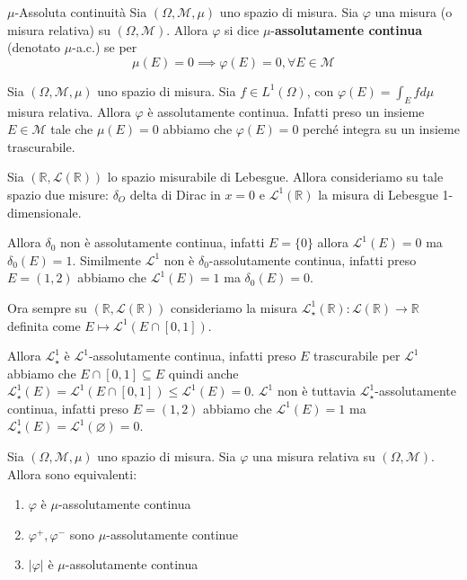 \begin{definition}{\(\mu\)-Assoluta continuità}
    Sia \((\Omega, \mathcal{M}, \mu)\) uno spazio di misura. Sia \(\varphi\) una
    misura (o misura relativa) su \((\Omega, \mathcal{M})\). Allora \(\varphi\)
    si dice \(\mu\)-\textbf{assolutamente continua} (denotato \(\mu\)-a.c.) se
    per 
    \[
        \mu(E) = 0 \implies \varphi(E) = 0, \forall E \in \mathcal{M}
    \]
\end{definition}
\begin{example}
    Sia \((\Omega, \mathcal{M}, \mu)\) uno spazio di misura. Sia \(f \in
    L^{1}(\Omega)\), con \(\varphi(E) = \int_E f d\mu\) misura relativa. Allora
    \(\varphi\) è assolutamente continua. Infatti preso un insieme \(E \in
    \mathcal{M}\) tale che \(\mu(E) = 0\) abbiamo che \(\varphi(E) = 0\) perché
    integra su un insieme trascurabile.
\end{example}
\begin{example}
    Sia \((\mathbb{R}, \mathcal{L}(\mathbb{R}))\) lo spazio misurabile di
    Lebesgue. Allora consideriamo su tale spazio due misure: \(\delta_O\) delta
    di Dirac in \(x=0\) e \(\mathcal{L}^{1}(\mathbb{R})\) la misura di Lebesgue
    1-dimensionale.

    Allora \(\delta_0\) non è assolutamente continua, infatti \(E =\{0\} \)
    allora \(\mathcal{L}^{1}(E) = 0\) ma \(\delta_0(E) = 1\). Similmente
    \(\mathcal{L}^{1}\) non è \(\delta_0\)-assolutamente continua, infatti preso
    \(E = (1, 2)\) abbiamo che \(\mathcal{L}^{1}(E) = 1\) ma \(\delta_0(E) =
    0\).
\end{example}
\begin{example}
    Ora sempre su \((\mathbb{R}, \mathcal{L}(\mathbb{R}))\) consideriamo la
    misura \(\mathcal{L}^{1}_{\star} (\mathbb{R}) : \mathcal{L}(\mathbb{R}) \to
    \mathbb{R}\) definita come \(E \mapsto \mathcal{L}^{1}(E \cap [0, 1])\).

    Allora \(\mathcal{L}^{1}_\star\) è \(\mathcal{L}^{1}\)-assolutamente
    continua, infatti preso \(E\) trascurabile per \(\mathcal{L}^{1}\) abbiamo
    che \(E \cap [0, 1] \subseteq E \) quindi anche \(\mathcal{L}^{1}_{\star}(E)
    = \mathcal{L}^{1}(E \cap [0,1]) \le \mathcal{L}^{1}(E) = 0\).
    \(\mathcal{L}^{1}\) non è tuttavia \(\mathcal{L}^{1}_\star\)-assolutamente
    continua, infatti preso \(E = (1, 2)\) abbiamo che \(\mathcal{L}^{1}(E) =
    1\) ma \(\mathcal{L}^{1}_\star(E) = \mathcal{L}^{1}(\varnothing)= 0\).
\end{example}
\begin{proposition}\label{prop:equivalenti_ac}
    Sia \((\Omega, \mathcal{M}, \mu)\) uno spazio di misura. Sia \(\varphi\) una
    misura relativa su \((\Omega, \mathcal{M})\). Allora sono equivalenti:
\begin{enumerate}[label = \roman*)]
    \item \(\varphi\) è \(\mu\)-assolutamente continua
    \item \(\varphi^{+}, \varphi^{-}\) sono \(\mu\)-assolutamente continue
    \item \(|\varphi|\) è \(\mu\)-assolutamente continua
\end{enumerate}
\end{proposition}
